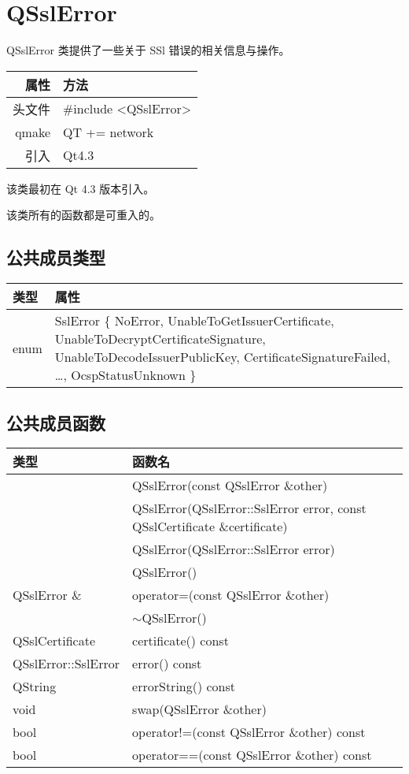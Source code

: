 \chapter{QSslError}

QSslError 类提供了一些关于 SSl 错误的相关信息与操作。

\begin{tabular}{|r|l|}
	\hline
	属性 & 方法 \\
	\hline
	头文件 & \#include <QSslError>\\      
	\hline
	qmake & QT += network\\      
	\hline
	引入 &	Qt4.3 \\ 
	\hline
\end{tabular}

该类最初在 Qt 4.3 版本引入。

\begin{notice}
该类所有的函数都是可重入的。
\end{notice}

\section{公共成员类型}

\begin{tabular}{|l|m{24em}|}
\hline 
类型 &	属性\\ 
\hline 
enum 	 &SslError \{ NoError, UnableToGetIssuerCertificate, 
			UnableToDecryptCertificateSignature, 
			UnableToDecodeIssuerPublicKey, 
			CertificateSignatureFailed, …, 
			OcspStatusUnknown \} \\
 \hline
\end{tabular}

\section{公共成员函数}

\begin{longtable}[l]{|m{19em}|m{24em}|}
\hline 
类型 &	函数名\\ 
\hline 
&QSslError(const QSslError \&other) \\ 
\hline
&QSslError(QSslError::SslError error, const QSslCertificate \&certificate) \\ 
\hline
&QSslError(QSslError::SslError error) \\ 
\hline
&QSslError() \\ 
\hline
QSslError \& &	operator=(const QSslError \&other) \\ 
\hline
& $\sim$QSslError()\\
\hline
QSslCertificate &	certificate() const\\
\hline
QSslError::SslError &	error() const\\
\hline
QString &	errorString() const\\
\hline
void &	swap(QSslError \&other) \\
\hline
bool &	operator!=(const QSslError \&other) const \\
\hline
bool &	operator==(const QSslError \&other) const\\
\hline 
\end{longtable}

